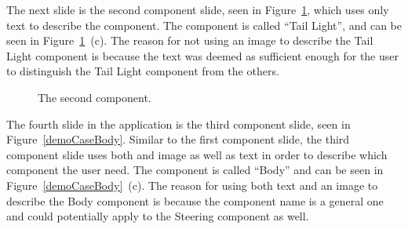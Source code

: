The next slide is the second component slide, seen in Figure~\ref{demoCaseTailLight}, which uses only text to describe the component. The component is called ``Tail Light'', and can be seen in Figure~\ref{demoCaseTailLight}~(c). The reason for not using an image to describe the Tail Light component is because the text was deemed as sufficient enough for the user to distinguish the Tail Light component from the others.

	\begin{figure}[ht!]
		\centering
		\qquad
		\qquad
		\caption{The second component.}
		\label{demoCaseTailLight}
	\end{figure}

The fourth slide in the application is the third component slide, seen in Figure~\ref{demoCaseBody}. Similar to the first component slide, the third component slide uses both and image as well as text in order to describe which component the user need. The component is called ``Body'' and can be seen in Figure~\ref{demoCaseBody}~(c). The reason for using both text and an image to describe the Body component is because the component name is a general one and could potentially apply to the Steering component as well.

